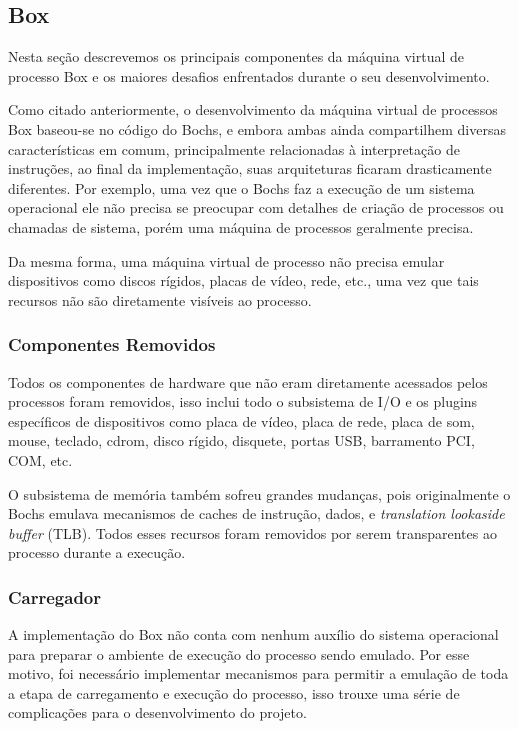 \documentclass[11pt,twoside]{article}
\begin{document}
\subsection{Box}

Nesta seção descrevemos os principais componentes da máquina virtual de processo
Box e os maiores desafios enfrentados durante o seu desenvolvimento.

Como citado anteriormente, o desenvolvimento da máquina virtual de processos Box
baseou-se no código do Bochs, e embora ambas ainda compartilhem diversas
características em comum, principalmente relacionadas à interpretação de
instruções, ao final da implementação, suas arquiteturas ficaram drasticamente
diferentes. Por exemplo, uma vez que o Bochs faz a execução de um sistema
operacional ele não precisa se preocupar com detalhes de criação de processos ou
chamadas de sistema, porém uma máquina de processos geralmente precisa. 

Da mesma forma, uma máquina virtual de processo não precisa emular dispositivos
como discos rígidos, placas de vídeo, rede, etc., uma vez que tais recursos não
são diretamente visíveis ao processo.

\subsubsection{Componentes Removidos}

Todos os componentes de hardware que não eram diretamente acessados pelos
processos foram removidos, isso inclui todo o subsistema de I/O e os
plugins específicos de dispositivos como placa de vídeo, placa de rede, placa de
som, mouse, teclado, cdrom, disco rígido, disquete, portas USB, barramento PCI,
COM, etc.

O subsistema de memória também sofreu grandes mudanças, pois originalmente o
Bochs emulava mecanismos de caches de instrução, dados, e \emph{translation
lookaside buffer} (TLB). Todos esses recursos foram removidos por serem
transparentes ao processo durante a execução.

\subsubsection{Carregador}

A implementação do Box não conta com nenhum auxílio do sistema operacional para
preparar o ambiente de execução do processo sendo emulado. Por esse motivo, foi
necessário implementar mecanismos para permitir a emulação de toda a etapa de
carregamento e execução do processo, isso trouxe uma série de complicações para
o desenvolvimento do projeto.
\end{document}
